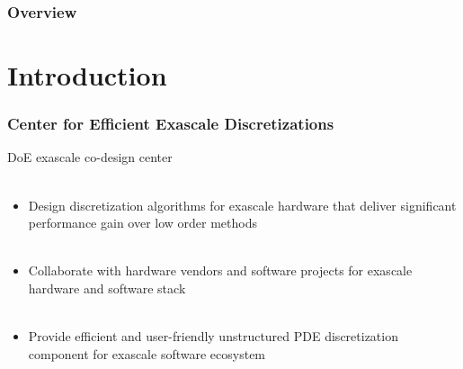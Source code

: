 \documentclass{beamer}
\begin{document}

\begin{frame}
\frametitle{Overview} %
\tableofcontents %
\end{frame}


\section{Introduction}

\begin{frame}
\begin{center}
\frametitle{Center for Efficient Exascale Discretizations}

\begin{flushleft}
DoE exascale co-design center\\

~\\
\end{flushleft}

\begin{itemize}

\item Design discretization algorithms for exascale hardware that deliver significant performance gain over low order methods\\

~\\

\item Collaborate with hardware vendors and software projects for exascale hardware and software stack\\

~\\

\item Provide efficient and user-friendly unstructured PDE discretization component for exascale software ecosystem

\end{itemize}

\end{center}
\end{frame}
\end{document}

